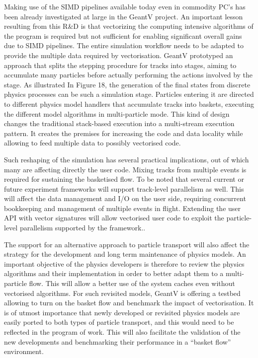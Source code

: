 \documentclass[12pt,a4paper]{article}
\begin{document}
Making use of the SIMD pipelines available today even in commodity PC's
has been already investigated at large in the GeantV project. An
important lesson resulting from this R\&D is that vectorizing the
computing intensive algorithms of the program is required but not
sufficient for enabling significant overall gains due to SIMD pipelines.
The entire simulation workflow needs to be adapted to provide the
multiple data required by vectorisation. GeantV prototyped an approach
that splits the stepping procedure for tracks into stages, aiming to
accumulate many particles before actually performing the actions
involved by the stage. As illustrated In Figure 18, the generation of
the final states from discrete physics processes can be such a
simulation stage. Particles entering it are directed to different
physics model handlers that accumulate tracks into baskets, executing
the different model algorithms in multi-particle mode. This kind of
design changes the traditional stack-based execution into a multi-stream
execution pattern. It creates the premises for increasing the code and
data locality while allowing to feed multiple data to possibly
vectorised code.

Such reshaping of the simulation has several practical implications, out
of which many are affecting directly the user code. Mixing tracks from
multiple events is required for sustaining the basketised flow. To be
noted that several current or future experiment frameworks will support
track-level parallelism as well. This will affect the data management
and I/O on the user side, requiring concurrent bookkeeping and
management of multiple events in flight. Extending the user API with
vector signatures will allow vectorised user code to exploit the
particle-level parallelism supported by the framework..

The support for an alternative approach to particle transport will also
affect the strategy for the development and long term maintenance of
physics models. An important objective of the physics developers is
therefore to review the physics algorithms and their implementation in
order to better adapt them to a multi-particle flow. This will allow a
better use of the system caches even without vectorised algorithms. For
such revisited models, GeantV is offering a testbed allowing to turn on
the basket flow and benchmark the impact of vectorisation. It is of
utmost importance that newly developed or revisited physics models are
easily ported to both types of particle transport, and this would need
to be reflected in the program of work. This will also facilitate the
validation of the new developments and benchmarking their performance in
a ``basket flow'' environment.
\end{document}
